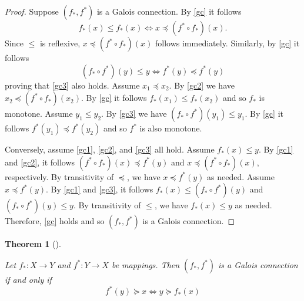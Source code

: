 \documentclass[
  letterpaper,
  10pt,
  reqno,
  twopage,
  openany]{book}
\theoremstyle{plain}
\theoremstyle{definition}
\theoremstyle{definition}
\theoremstyle{definition}
\theoremstyle{plain}
\theoremstyle{plain}
\newtheorem{theorem}{Theorem}[chapter]
\theoremstyle{remark}
\begin{document}
\begin{proof}

Suppose \((f_*, f^*)\) is a Galois connection. By \eqref{gc} it follows
\[
f_*(x)\leqslant f_*(x)  \Longleftrightarrow x\preceq (f^*\circ f_*)(x). 
\] Since \(\leqslant\) is reflexive, \(x\preceq (f^*\circ f_*)(x)\)
follows immediately. Similarly, by \eqref{gc} it follows \[
(f_*\circ f^*)(y)\leqslant y \Longleftrightarrow f^*(y)\preceq f^*(y)
\] proving that \eqref{gc3} also holds. Assume \(x_1\preceq x_2\). By
\eqref{gc2} we have \(x_2\preceq (f^*\circ f_*)(x_2)\). By \eqref{gc} it
follows \(f_*(x_1)\leqslant f_*(x_2)\) and so \(f_*\) is monotone.
Assume \(y_1\leqslant y_2\). By \eqref{gc3} we have
\((f_*\circ f^*)(y_1)\leqslant y_1\). By \eqref{gc} it follows
\(f^*(y_1)\preceq f^*(y_2)\) and so \(f^*\) is also monotone.

Conversely, assume \eqref{gc1}, \eqref{gc2}, and \eqref{gc3} all hold.
Assume \(f_*(x)\leqslant y\). By \eqref{gc1} and \eqref{gc2}, it follows
\((f^*\circ f_*)(x)\preceq f^*(y)\) and \(x\preceq (f^*\circ f_*)(x)\),
respectively. By transitivity of \(\preceq\), we have
\(x\preceq f^*(y)\) as needed. Assume \(x\preceq f^*(y)\). By
\eqref{gc1} and \eqref{gc3}, it follows
\(f_*(x)\leqslant (f_*\circ f^*)(y)\) and
\((f_*\circ f^*)(y)\leqslant y\). By transitivity of \(\leqslant\), we
have \(f_*(x)\leqslant y\) as needed. Therefore, \eqref{gc} holds and so
\((f_*, f^*)\) is a Galois connection.

\end{proof}

\leavevmode{}%
\begin{theorem}[]\label{thm-galois-connection-if-and-only-if}

Let \(f_*:X\to Y\) and \(f^*:Y\to X\) be mappings. Then \((f_*, f^*)\)
is a Galois connection if and only if \[
f^*(y) \succeq x \Longleftrightarrow y \succeq f_*(x)
\]

\end{theorem}
\end{document}
